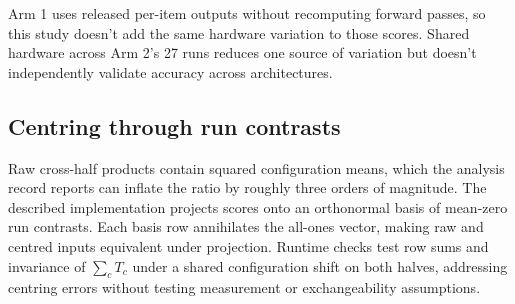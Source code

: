 Arm 1 uses released per-item outputs without recomputing forward passes, so this study doesn't add the same hardware variation to those scores. Shared hardware across Arm 2's 27 runs reduces one source of variation but doesn't independently validate accuracy across architectures.

\subsection{Centring through run contrasts}
\label{app:centring}
Raw cross-half products contain squared configuration means, which the analysis record reports can inflate the ratio by roughly three orders of magnitude. The described implementation projects scores onto an orthonormal basis of mean-zero run contrasts. Each basis row annihilates the all-ones vector, making raw and centred inputs equivalent under projection. Runtime checks test row sums and invariance of $\sum_c T_c$ under a shared configuration shift on both halves, addressing centring errors without testing measurement or exchangeability assumptions.
